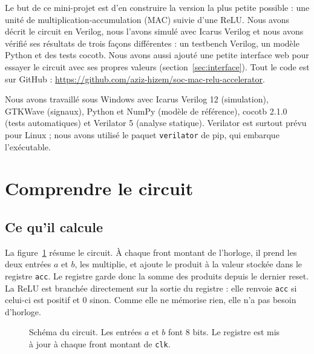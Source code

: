 \documentclass[11pt,a4paper]{article}
\begin{document}
Le but de ce mini-projet est d'en construire la version la plus petite possible :
une unité de multiplication-accumulation (MAC) suivie d'une ReLU. Nous avons décrit
le circuit en Verilog, nous l'avons simulé avec Icarus Verilog et nous avons vérifié
ses résultats de trois façons différentes : un testbench Verilog, un modèle Python
et des tests cocotb. Nous avons aussi ajouté une petite interface web pour essayer
le circuit avec ses propres valeurs (section~\ref{sec:interface}). Tout le code est
sur GitHub : \url{https://github.com/aziz-hizem/soc-mac-relu-accelerator}.

Nous avons travaillé sous Windows avec Icarus Verilog 12 (simulation), GTKWave
(signaux), Python et NumPy (modèle de référence), cocotb 2.1.0 (tests automatiques)
et Verilator 5 (analyse statique). Verilator est surtout prévu pour Linux ; nous
avons utilisé le paquet \texttt{verilator} de pip, qui embarque l'exécutable.

\section{Comprendre le circuit}

\subsection{Ce qu'il calcule}

La figure~\ref{fig:schema} résume le circuit. À chaque front montant de l'horloge,
il prend les deux entrées $a$ et $b$, les multiplie, et ajoute le produit à la
valeur stockée dans le registre \texttt{acc}. Le registre garde donc la somme des
produits depuis le dernier reset. La ReLU est branchée directement sur la sortie du
registre : elle renvoie \texttt{acc} si celui-ci est positif et $0$ sinon. Comme
elle ne mémorise rien, elle n'a pas besoin d'horloge.

\begin{figure}[h]
\centering
{}
\caption{Schéma du circuit. Les entrées $a$ et $b$ font 8 bits. Le registre est
mis à jour à chaque front montant de \texttt{clk}.}
\label{fig:schema}
\end{figure}
\end{document}
